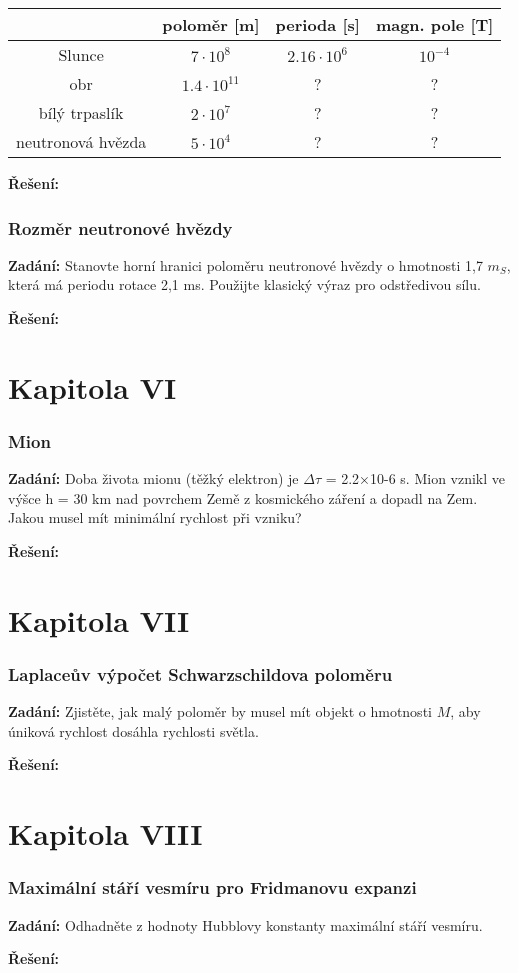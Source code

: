 \documentclass{article}
\begin{document}
\begin{tabular}{| c || c | c | c |}
  \hline
  & poloměr [m] & perioda [s] & magn. pole [T]\\
  \hline \hline
  Slunce & $7 \cdot 10^{8}$ & $2.16 \cdot 10^{6}$ & $10^{-4}$\\
  obr & $1.4 \cdot 10^{11}$ & ? & ?\\
  bílý trpaslík & $2 \cdot 10^{7}$ & ? & ?\\
  neutronová hvězda & $5 \cdot 10^{4}$ & ? & ?\\
  \hline
\end{tabular}

\textbf{Řešení:}

\section*{Rozměr neutronové hvězdy}
\textbf{Zadání:}  Stanovte horní hranici poloměru neutronové hvězdy o hmotnosti 1,7 $m_S$, která má
periodu rotace 2,1 ms. Použijte klasický výraz pro odstředivou sílu.

\textbf{Řešení:}

\part*{Kapitola \textrm{V\hspace{-.1em}I}}

\section*{Mion}
\textbf{Zadání:}  Doba života mionu (těžký elektron) je $\Delta \tau$ = 2.2×10-6 s. Mion vznikl ve výšce h = 30 km
nad povrchem Země z kosmického záření a dopadl na Zem. Jakou musel mít minimální rychlost
při vzniku?

\textbf{Řešení:}

\part*{Kapitola \textrm{V\hspace{-.1em}I\hspace{-.1em}I}}

\section*{Laplaceův výpočet Schwarzschildova poloměru}
\textbf{Zadání:}  Zjistěte, jak malý poloměr by musel mít objekt o hmotnosti $M$, aby úniková rychlost
dosáhla rychlosti světla.

\textbf{Řešení:}

\part*{Kapitola \textrm{V\hspace{-.1em}I\hspace{-.1em}I\hspace{-.1em}I}}

\section*{Maximální stáří vesmíru pro Fridmanovu expanzi}
\textbf{Zadání:}  Odhadněte z hodnoty Hubblovy konstanty maximální stáří vesmíru.

\textbf{Řešení:}
\end{document}
